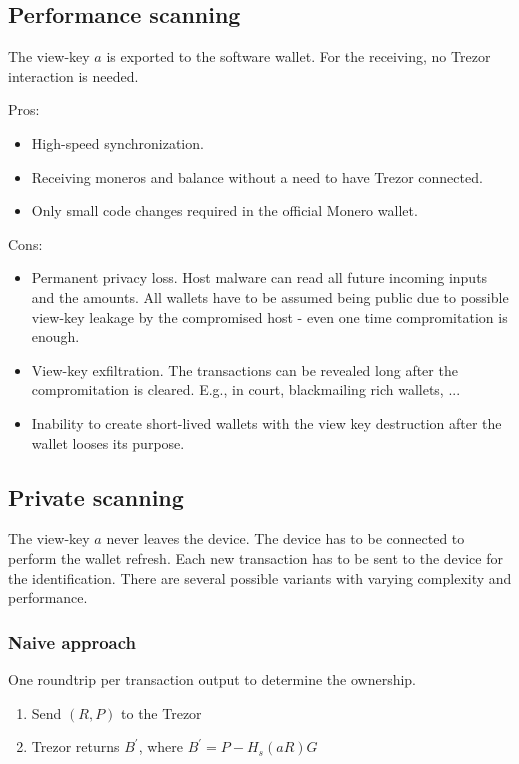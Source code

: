 \documentclass[]{article}
\begin{document}
\subsection{Performance scanning} 
The view-key $a$ is exported to the software wallet. For the receiving, no Trezor interaction is needed. 

\noindent Pros:
\begin{itemize}
	\item High-speed synchronization.
	\item Receiving moneros and balance without a need to have Trezor connected.
	\item Only small code changes required in the official Monero wallet.
\end{itemize}

\noindent Cons:
\begin{itemize}
	\item Permanent privacy loss. Host malware can read all future incoming inputs and the amounts. All wallets have to be assumed being public due to possible view-key leakage by the compromised host - even one time compromitation is enough.
	\item View-key exfiltration. The transactions can be revealed long after the compromitation is cleared. E.g., in court, blackmailing rich wallets, ...
	\item Inability to create short-lived wallets with the view key destruction after the wallet looses its purpose. 
\end{itemize}

\subsection{Private scanning}
The view-key $a$ never leaves the device. The device has to be connected
to perform the wallet refresh. 
Each new transaction has to be sent to the device for the identification.
There are several possible variants with varying complexity and performance.

\subsubsection{Naive approach} One roundtrip per transaction output to determine the ownership. 
\begin{enumerate}
	\item Send $(R, P)$ to the Trezor
	\item Trezor returns $B^\prime$, where $B^\prime = P - H_s(aR)G$
\end{enumerate}
\end{document}

